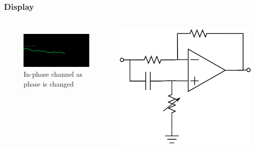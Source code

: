 \documentclass{beamer}
\begin{document}
\begin{frame}
\frametitle{Display}
\begin{columns}
\begin{figure}
\includegraphics[scale=.3]{Snap.png}\\
In-phase channel as phase is changed
\end{figure}
\includegraphics[scale=.3]{PhaseShift}
\end{columns}
\end{frame}
\end{document}
